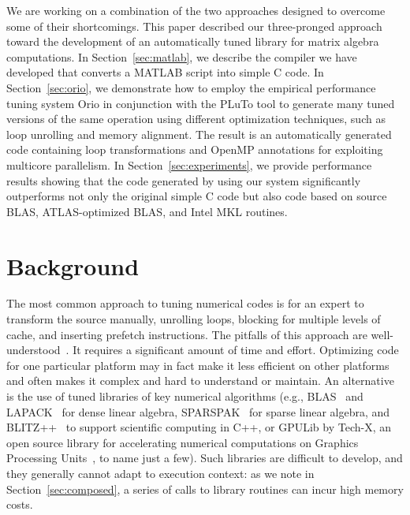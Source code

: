 \documentclass[11pt]{article}
\begin{document}
We are working on a combination of the two approaches designed to overcome some of their shortcomings.   This paper described our three-pronged approach toward the development of an automatically tuned library for matrix algebra computations.  In Section~\ref{sec:matlab}, we describe the compiler we have developed that converts a MATLAB script into simple C code. In Section~\ref{sec:orio}, we demonstrate how to employ the empirical performance tuning system Orio in conjunction with the PLuTo tool to generate many tuned versions of the same operation using different optimization techniques, such as loop unrolling and memory alignment.  The result is an automatically generated code containing loop transformations and OpenMP annotations for exploiting multicore parallelism. In Section~\ref{sec:experiments}, we provide performance results showing that the code generated by using our system significantly outperforms not only the original simple C code but also code based on source BLAS, ATLAS-optimized BLAS, and Intel MKL routines.

\section{Background}
\label{sec:background}


The most common approach  to tuning numerical codes is for an expert to transform the source manually, unrolling loops, blocking for multiple levels of cache, and inserting prefetch instructions.  The pitfalls of this approach are well-understood~\cite{Goedecker01}.  It requires a significant amount of time and effort. Optimizing code for one particular platform may in fact make it less efficient on other platforms and often makes it complex and hard to understand or maintain.    An alternative is the use of tuned libraries of key numerical algorithms (e.g., BLAS~\cite{Dongarra:1990fk} and LAPACK~\cite{LAPACK} for dense linear algebra, SPARSPAK~\cite{sparspak} for sparse linear algebra, and BLITZ++~\cite{blitz} to support scientific computing in C++, or GPULib by Tech-X, an open source library for accelerating numerical computations on Graphics Processing Units~\cite{gpulib}, to name just a few). Such libraries are difficult to develop, and they generally cannot adapt to execution context: as we note in Section~\ref{sec:composed}, a series of calls to library routines can incur high memory costs.
\end{document}
